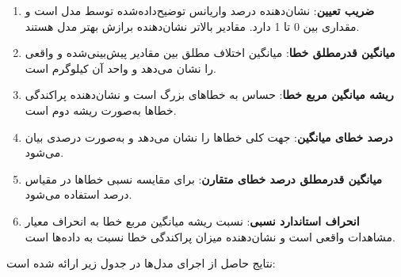 \begin{enumerate}
	\item \textbf{ضریب تعیین}: نشان‌دهنده درصد واریانس توضیح‌داده‌شده توسط مدل است و مقداری بین 0 تا 1 دارد. مقادیر بالاتر نشان‌دهنده برازش بهتر مدل هستند.
	
	\item \textbf{میانگین قدرمطلق خطا}: میانگین اختلاف مطلق بین مقادیر پیش‌بینی‌شده و واقعی را نشان می‌دهد و واحد آن کیلوگرم است.
	
	\item \textbf{ریشه میانگین مربع خطا}: حساس به خطاهای بزرگ است و نشان‌دهنده پراکندگی خطاها به‌صورت ریشه دوم است.
	
	\item \textbf{درصد خطای میانگین}: جهت کلی خطاها را نشان می‌دهد و به‌صورت درصدی بیان می‌شود.
	
	\item \textbf{میانگین قدرمطلق درصد خطای متقارن}: برای مقایسه نسبی خطاها در مقیاس درصد استفاده می‌شود.
	
	\item \textbf{انحراف استاندارد نسبی}: نسبت ریشه میانگین مربع خطا به انحراف معیار مشاهدات واقعی است و نشان‌دهنده میزان پراکندگی خطا نسبت به داده‌ها است.
\end{enumerate}

نتایج حاصل از اجرای مدل‌ها در جدول زیر ارائه شده است:

